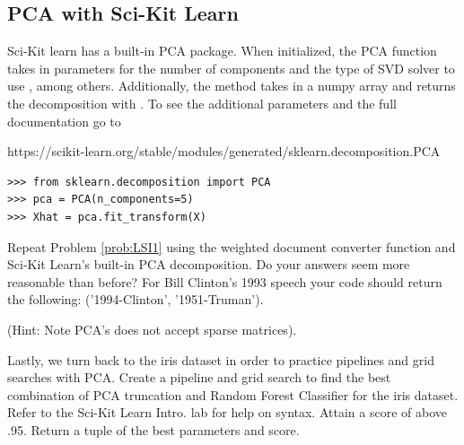 \subsection*{PCA with Sci-Kit Learn}
Sci-Kit learn has a built-in PCA package. When initialized, the PCA function takes in parameters for the number of components  and the type of SVD solver to use , among others.  Additionally, the  method takes in a numpy array and returns the decomposition with .
To see the additional parameters and the full documentation go to 

https://scikit-learn.org/stable/modules/generated/sklearn.decomposition.PCA

 

\begin{lstlisting}
>>> from sklearn.decomposition import PCA 
>>> pca = PCA(n_components=5)
>>> Xhat = pca.fit_transform(X)
\end{lstlisting}

\begin{problem}
Repeat Problem \ref{prob:LSI1} using the weighted document converter function and Sci-Kit Learn's built-in PCA decomposition. Do your answers seem more reasonable than before?
For Bill Clinton's 1993 speech your code should return the following: ('1994-Clinton', '1951-Truman').

(Hint: Note PCA's   does not accept sparse matrices).
\end{problem}

\begin{problem}
Lastly, we turn back to the iris dataset in order to practice pipelines and grid searches with PCA. Create a pipeline and grid search to find the best combination of PCA truncation and Random Forest Classifier for the iris dataset. Refer to the Sci-Kit Learn Intro. lab for help on syntax. Attain a score of above .95. Return a tuple of the best parameters and score. 
\end{problem}





